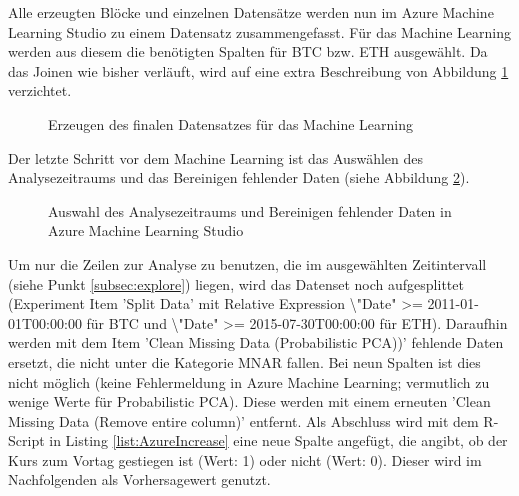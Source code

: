 Alle erzeugten Blöcke und einzelnen Datensätze werden nun im Azure Machine Learning Studio zu einem Datensatz zusammengefasst. Für das Machine Learning werden aus diesem die benötigten Spalten für BTC bzw. ETH ausgewählt. Da das Joinen wie bisher verläuft, wird auf eine extra Beschreibung von Abbildung \ref{fig:azureFinalSet} verzichtet.
\begin{figure}[H]
\centering
{}
\caption{Erzeugen des finalen Datensatzes für das Machine Learning}
\label{fig:azureFinalSet}
\end{figure}
Der letzte Schritt vor dem Machine Learning ist das Auswählen des Analysezeitraums und das Bereinigen fehlender Daten (siehe Abbildung \ref{fig:azureDateAndCleaning}).
\begin{figure}[H]
\centering
{}
\caption{Auswahl des Analysezeitraums und Bereinigen fehlender Daten in Azure Machine Learning Studio}
\label{fig:azureDateAndCleaning}
\end{figure}
Um nur die Zeilen zur Analyse zu benutzen, die im ausgewählten Zeitintervall (siehe Punkt \ref{subsec:explore}) liegen, wird das Datenset noch aufgesplittet (Experiment Item 'Split Data' mit Relative Expression \textbackslash "Date" >= 2011-01-01T00:00:00 für BTC und \textbackslash "Date" >= 2015-07-30T00:00:00 für ETH). Daraufhin werden mit dem Item 'Clean Missing Data (Probabilistic PCA))' fehlende Daten ersetzt, die nicht unter die Kategorie MNAR fallen. Bei neun Spalten ist dies nicht möglich (keine Fehlermeldung in Azure Machine Learning; vermutlich zu wenige Werte für Probabilistic PCA). Diese werden mit einem erneuten 'Clean Missing Data (Remove entire column)' entfernt. Als Abschluss wird mit dem R-Script in Listing \ref{list:AzureIncrease} eine neue Spalte angefügt, die angibt, ob der Kurs zum Vortag gestiegen ist (Wert: 1) oder nicht (Wert: 0). Dieser wird im Nachfolgenden als Vorhersagewert genutzt.
